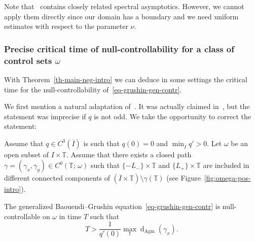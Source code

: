 \documentclass[AHL,Unicode,longabstracts,published]{cedram}
\newcommand{\1}{\mathds 1}
\newcommand{\dagmon}{\mathop{\mathrm{d}}\nolimits_{\mathrm{Agm}}}
\newcommand{\T}{\mathbb{T}}
\newcommand{\g}{\gamma}
\renewcommand{\o}{\omega}
\renewcommand{\o}{\omega}
\begin{document}
Note that~\cite{HSS05} contains closely related spectral asymptotics. However, we cannot apply them directly since our domain has a boundary and we need uniform estimates with respect to the parameter $\nu$.

\subsubsection{Precise critical time of null-controllability for a class of control sets $\o$}

With Theorem~\ref{th-main-neg-intro} we can deduce in some settings the critical time for the null-controllability of~\eqref{eq-grushin-gen-contr}.


We first mention a natural adaptation of~\cite[Theorem~3.1]{DK20}. It was actually claimed in~\cite[Remark~3.2]{DK20}, but the statement was imprecise if $q$ is not odd. We take the opportunity to correct the statement:

\begin{theo}\label{th-main-pos-intro}
Assume that $q\in C^3(\overline I)$ is such that $q(0) = 0$ and $\min_{\overline I} q' >0$. Let $\o$ be an open subset of $I\times \T$. Assume that there exists a closed path $\gamma = (\g_x, \g_y) \in C^0(\T;\, \omega)$ such that $\{-L_-\}\times \T$ and $\{L_+\}\times \T$ are included in different connected components of $(\overline I\times\T) \setminus \g(\T)$ (see Figure~\ref{fig:omega-pos-intro}).

The generalized Baouendi--Grushin equation~\eqref{eq-grushin-gen-contr} is null-controllable on $\o$ in time $T$ such that
\[
T> \frac{1}{q'(0)}\max_\T\dagmon(\g_x).
\]
\end{theo}
\end{document}
